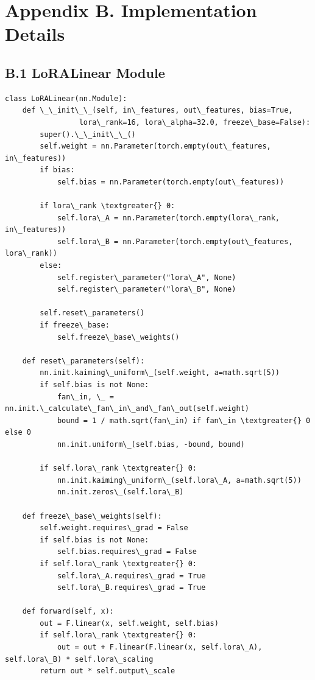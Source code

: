 \section{Appendix B. Implementation Details}

\subsection{B.1 LoRALinear Module}

\begin{lstlisting}
class LoRALinear(nn.Module):
    def \_\_init\_\_(self, in\_features, out\_features, bias=True,
                 lora\_rank=16, lora\_alpha=32.0, freeze\_base=False):
        super().\_\_init\_\_()
        self.weight = nn.Parameter(torch.empty(out\_features, in\_features))
        if bias:
            self.bias = nn.Parameter(torch.empty(out\_features))
        
        if lora\_rank \textgreater{} 0:
            self.lora\_A = nn.Parameter(torch.empty(lora\_rank, in\_features))
            self.lora\_B = nn.Parameter(torch.empty(out\_features, lora\_rank))
        else:
            self.register\_parameter("lora\_A", None)
            self.register\_parameter("lora\_B", None)
        
        self.reset\_parameters()
        if freeze\_base:
            self.freeze\_base\_weights()
    
    def reset\_parameters(self):
        nn.init.kaiming\_uniform\_(self.weight, a=math.sqrt(5))
        if self.bias is not None:
            fan\_in, \_ = nn.init.\_calculate\_fan\_in\_and\_fan\_out(self.weight)
            bound = 1 / math.sqrt(fan\_in) if fan\_in \textgreater{} 0 else 0
            nn.init.uniform\_(self.bias, -bound, bound)
        
        if self.lora\_rank \textgreater{} 0:
            nn.init.kaiming\_uniform\_(self.lora\_A, a=math.sqrt(5))
            nn.init.zeros\_(self.lora\_B)
    
    def freeze\_base\_weights(self):
        self.weight.requires\_grad = False
        if self.bias is not None:
            self.bias.requires\_grad = False
        if self.lora\_rank \textgreater{} 0:
            self.lora\_A.requires\_grad = True
            self.lora\_B.requires\_grad = True
    
    def forward(self, x):
        out = F.linear(x, self.weight, self.bias)
        if self.lora\_rank \textgreater{} 0:
            out = out + F.linear(F.linear(x, self.lora\_A), self.lora\_B) * self.lora\_scaling
        return out * self.output\_scale
\end{lstlisting}


